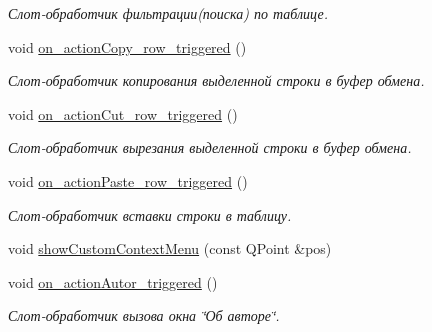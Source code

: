 \begin{DoxyCompactItemize}
\begin{DoxyCompactList}\small\item\em Слот-\/обработчик фильтрации(поиска) по таблице. \end{DoxyCompactList}\item 
\mbox{\label{class_main_window_afe7e74076cbe4a1aeebe7a9d6ff697c7}} 
void \mbox{\hyperlink{class_main_window_afe7e74076cbe4a1aeebe7a9d6ff697c7}{on\+\_\+action\+Copy\+\_\+row\+\_\+triggered}} ()
\begin{DoxyCompactList}\small\item\em Слот-\/обработчик копирования выделенной строки в буфер обмена. \end{DoxyCompactList}\item 
\mbox{\label{class_main_window_a55b6f87d0763e94e20e77b86bde8cf59}} 
void \mbox{\hyperlink{class_main_window_a55b6f87d0763e94e20e77b86bde8cf59}{on\+\_\+action\+Cut\+\_\+row\+\_\+triggered}} ()
\begin{DoxyCompactList}\small\item\em Слот-\/обработчик вырезания выделенной строки в буфер обмена. \end{DoxyCompactList}\item 
\mbox{\label{class_main_window_aeb856e49f93753584025a14a077c0e7b}} 
void \mbox{\hyperlink{class_main_window_aeb856e49f93753584025a14a077c0e7b}{on\+\_\+action\+Paste\+\_\+row\+\_\+triggered}} ()
\begin{DoxyCompactList}\small\item\em Слот-\/обработчик вставки строки в таблицу. \end{DoxyCompactList}\item 
void \mbox{\hyperlink{class_main_window_ac9b3f3c02dccbd067c7b614034ffc035}{show\+Custom\+Context\+Menu}} (const Q\+Point \&pos)
\item 
\mbox{\label{class_main_window_a845ab78a4a6af1cff0822616dd80d909}} 
void \mbox{\hyperlink{class_main_window_a845ab78a4a6af1cff0822616dd80d909}{on\+\_\+action\+Autor\+\_\+triggered}} ()
\begin{DoxyCompactList}\small\item\em Слот-\/обработчик вызова окна \char`\"{}Об авторе\char`\"{}. \end{DoxyCompactList}\item 

\end{DoxyCompactItemize}

